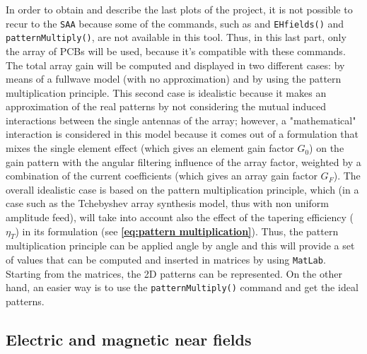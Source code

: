 \documentclass[10 pt,a4paper,twocolumn]{article}
\begin{document}
{In order to obtain and describe the last plots of the project, it is not possible to recur to the \texttt{SAA} because some of the commands, such as  and \texttt{EHfields()} and \texttt{patternMultiply()}, are not available in this tool. Thus, in this last part, only the array of PCBs will be used, because it's compatible with these commands. The total array gain will be computed and displayed in two different cases: by means of a fullwave model (with no approximation) and by using the pattern multiplication principle. This second case is idealistic because it makes an approximation of the real patterns by not considering the mutual induced interactions between the single antennas of the array; however, a "mathematical" interaction is considered in this model because it comes out of a formulation that mixes the single element effect (which gives an element gain factor $G_0$) on the gain pattern with the angular filtering influence of the array factor, weighted by a combination of the current coefficients (which gives an array gain factor $G_F$). The overall idealistic case is based on the pattern multiplication principle, which (in a case such as the Tchebyshev array synthesis model, thus with non uniform amplitude feed), will take into account also the effect of the tapering efficiency ($\eta_T$) in its formulation (see \textbf{\cref{eq:pattern multiplication}}). Thus, the pattern multiplication principle can be applied angle by angle and this will provide a set of values that can be computed and inserted in matrices by using \texttt{MatLab}. Starting from the matrices, the 2D patterns can be represented. On the other hand, an easier way is to use the \texttt{patternMultiply()} command and get the ideal patterns. 


\subsection*{Electric and magnetic near fields}

}
\end{document}
